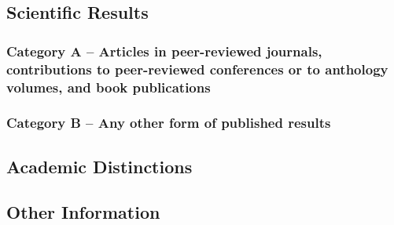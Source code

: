\documentclass[english, 53.200]{proposal}
\begin{document}
\subsection*{Scientific Results}
\nocite{*}

\subsubsection*{Category A -- Articles in peer-reviewed journals, contributions to peer-reviewed conferences or to anthology volumes, and book publications}
\printbibliography[category=reviewed, heading=none]

\subsubsection*{Category B -- Any other form of published results}
\printbibliography[category=nonreviewed, heading=none, resetnumbers=true]

\subsection*{Academic Distinctions}

\subsection*{Other Information}
\end{document}
